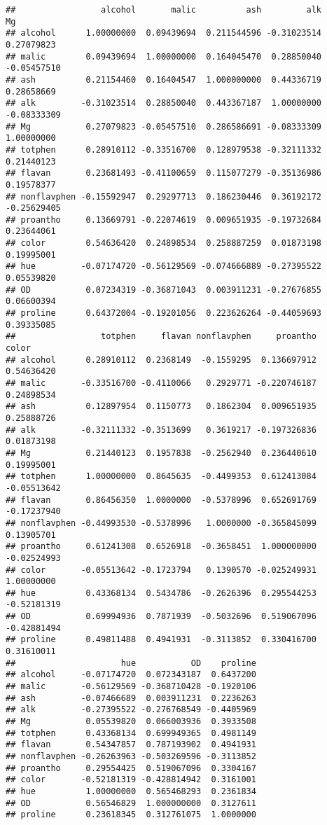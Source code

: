 \documentclass[
]{book}
\begin{document}
\begin{verbatim}
##                 alcohol       malic          ash         alk          Mg
## alcohol      1.00000000  0.09439694  0.211544596 -0.31023514  0.27079823
## malic        0.09439694  1.00000000  0.164045470  0.28850040 -0.05457510
## ash          0.21154460  0.16404547  1.000000000  0.44336719  0.28658669
## alk         -0.31023514  0.28850040  0.443367187  1.00000000 -0.08333309
## Mg           0.27079823 -0.05457510  0.286586691 -0.08333309  1.00000000
## totphen      0.28910112 -0.33516700  0.128979538 -0.32111332  0.21440123
## flavan       0.23681493 -0.41100659  0.115077279 -0.35136986  0.19578377
## nonflavphen -0.15592947  0.29297713  0.186230446  0.36192172 -0.25629405
## proantho     0.13669791 -0.22074619  0.009651935 -0.19732684  0.23644061
## color        0.54636420  0.24898534  0.258887259  0.01873198  0.19995001
## hue         -0.07174720 -0.56129569 -0.074666889 -0.27395522  0.05539820
## OD           0.07234319 -0.36871043  0.003911231 -0.27676855  0.06600394
## proline      0.64372004 -0.19201056  0.223626264 -0.44059693  0.39335085
##                 totphen     flavan nonflavphen     proantho       color
## alcohol      0.28910112  0.2368149  -0.1559295  0.136697912  0.54636420
## malic       -0.33516700 -0.4110066   0.2929771 -0.220746187  0.24898534
## ash          0.12897954  0.1150773   0.1862304  0.009651935  0.25888726
## alk         -0.32111332 -0.3513699   0.3619217 -0.197326836  0.01873198
## Mg           0.21440123  0.1957838  -0.2562940  0.236440610  0.19995001
## totphen      1.00000000  0.8645635  -0.4499353  0.612413084 -0.05513642
## flavan       0.86456350  1.0000000  -0.5378996  0.652691769 -0.17237940
## nonflavphen -0.44993530 -0.5378996   1.0000000 -0.365845099  0.13905701
## proantho     0.61241308  0.6526918  -0.3658451  1.000000000 -0.02524993
## color       -0.05513642 -0.1723794   0.1390570 -0.025249931  1.00000000
## hue          0.43368134  0.5434786  -0.2626396  0.295544253 -0.52181319
## OD           0.69994936  0.7871939  -0.5032696  0.519067096 -0.42881494
## proline      0.49811488  0.4941931  -0.3113852  0.330416700  0.31610011
##                     hue           OD    proline
## alcohol     -0.07174720  0.072343187  0.6437200
## malic       -0.56129569 -0.368710428 -0.1920106
## ash         -0.07466689  0.003911231  0.2236263
## alk         -0.27395522 -0.276768549 -0.4405969
## Mg           0.05539820  0.066003936  0.3933508
## totphen      0.43368134  0.699949365  0.4981149
## flavan       0.54347857  0.787193902  0.4941931
## nonflavphen -0.26263963 -0.503269596 -0.3113852
## proantho     0.29554425  0.519067096  0.3304167
## color       -0.52181319 -0.428814942  0.3161001
## hue          1.00000000  0.565468293  0.2361834
## OD           0.56546829  1.000000000  0.3127611
## proline      0.23618345  0.312761075  1.0000000
\end{verbatim}
\end{document}
